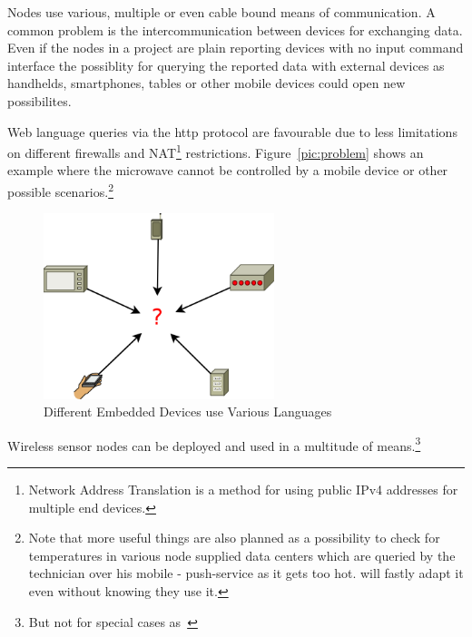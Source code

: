 Nodes use various, multiple or even cable bound means of communication. A common problem is the intercommunication between devices for 
exchanging data. Even if the nodes in a project are plain reporting devices with no input command interface the possiblity for
querying the reported data with external devices as handhelds, smartphones, tables or other mobile devices could open new possibilites.

Web language queries via the http protocol are favourable due to less limitations on different firewalls and NAT\footnote{Network Address Translation is a
method for using public IPv4 addresses for multiple end devices.}  restrictions. Figure~\ref{pic:problem} shows an example where the microwave cannot
be controlled by a mobile device or other possible scenarios.\footnote{Note that more useful things are also planned as a possibility to check for 
temperatures in various node supplied data centers which are queried by the technician over his mobile - push-service as it gets too hot.
 will fastly adapt it even without knowing they use it.}

\begin{figure}[h]
   \centering
   \includegraphics[width=0.6\textwidth]{pic/problem.png}%
   \caption{Different Embedded Devices use Various Languages}
   \label{problem}%
\end{figure}


Wireless sensor nodes can be deployed and used in a multitude of means.\footnote{But not for special cases as~\cite{biederbeck}}
